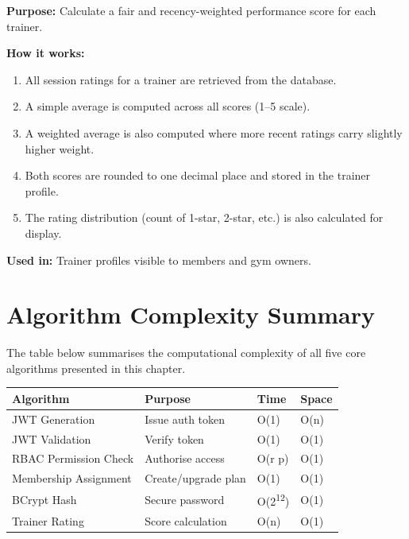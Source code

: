 \documentclass[
  12pt,
  a4paperpaper,
]{report}
\begin{document}
\noindent\textbf{Purpose:} Calculate a fair and recency-weighted performance score for each trainer.

\smallskip
\noindent\textbf{How it works:}
\begin{enumerate}
  \item All session ratings for a trainer are retrieved from the database.
  \item A simple average is computed across all scores (1--5 scale).
  \item A weighted average is also computed where more recent ratings carry slightly higher weight.
  \item Both scores are rounded to one decimal place and stored in the trainer profile.
  \item The rating distribution (count of 1-star, 2-star, etc.) is also calculated for display.
\end{enumerate}

\noindent\textbf{Used in:} Trainer profiles visible to members and gym owners.

\section{Algorithm Complexity Summary}\label{algo-complexity}

\noindent
The table below summarises the computational complexity of all five core algorithms presented in this chapter.

{
\renewcommand{\arraystretch}{1.5}
\begin{longtable}[]{@{} p{} p{} p{} p{} @{}}
\hline
\textbf{Algorithm} & \textbf{Purpose} & \textbf{Time} & \textbf{Space} \\
\hline
\endhead
\hline
\endlastfoot
JWT Generation & Issue auth token & O(1) & O(n) \\
JWT Validation & Verify token & O(1) & O(1) \\
RBAC Permission Check & Authorise access & O(r \texttimes{} p) & O(1) \\
Membership Assignment & Create/upgrade plan & O(1) & O(1) \\
BCrypt Hash & Secure password & O(2\textsuperscript{12}) & O(1) \\
Trainer Rating & Score calculation & O(n) & O(1) \\
\end{longtable}
}
\end{document}
